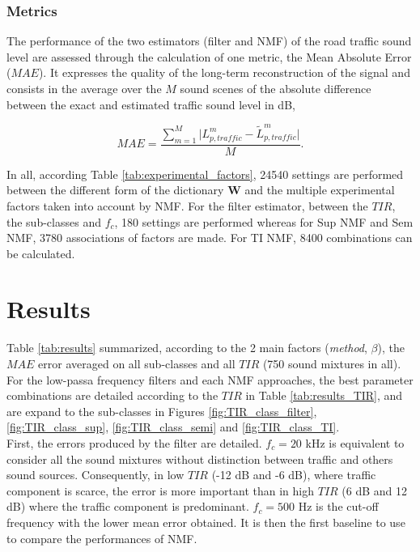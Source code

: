 \documentclass[twocolumn,a4paper,10pt]{article}
\begin{document}
\subsubsection{Metrics}
The performance of the two estimators (filter and NMF) of the road traffic sound level are assessed through the calculation of one metric, the Mean Absolute Error ($MAE$). It expresses the quality of the long-term reconstruction of the signal and consists in the average over the $M$ sound scenes of the absolute difference between the exact and estimated traffic sound level in dB,

\begin{equation}
MAE = \frac{\sum_{m = 1}^M\vert L^m_{p,traffic}-\tilde{L}^m_{p,traffic} \vert}{M}.
\end{equation}

In all, according Table \ref{tab:experimental_factors}, 24540 settings are performed between the different form of the dictionary $\mathbf{W}$ and the multiple experimental factors taken into account by NMF. For the filter estimator, between the $TIR$, the sub-classes and $f_c$, 180 settings are performed whereas for Sup NMF and Sem NMF, 3780 associations of factors are made. For TI NMF, 8400 combinations can be calculated.

\section{Results}\label{part:results}

Table \ref{tab:results} summarized, according to the 2 main factors (\textit{method}, $\beta$), the $MAE$ error averaged on all sub-classes and all $TIR$ (750 sound mixtures in all). For the low-passa frequency filters and each NMF approaches, the best parameter combinations are detailed according to the $TIR$ in Table \ref{tab:results_TIR},  and are expand to the sub-classes in Figures \ref{fig:TIR_class_filter}, \ref{fig:TIR_class_sup}, \ref{fig:TIR_class_semi} and \ref{fig:TIR_class_TI}. \\

First, the errors produced by the filter are detailed. $f_c = 20 $ kHz is equivalent to consider all the sound mixtures without distinction between traffic and others sound sources. Consequently, in low $TIR$ (-12 dB and -6 dB), where traffic component is scarce, the error is more important than in high $TIR$ (6 dB and 12 dB) where the traffic component is predominant. $f_c = 500$ Hz is the cut-off frequency with the lower mean error obtained. It is then the first baseline to use to compare the performances of NMF.
\end{document}
